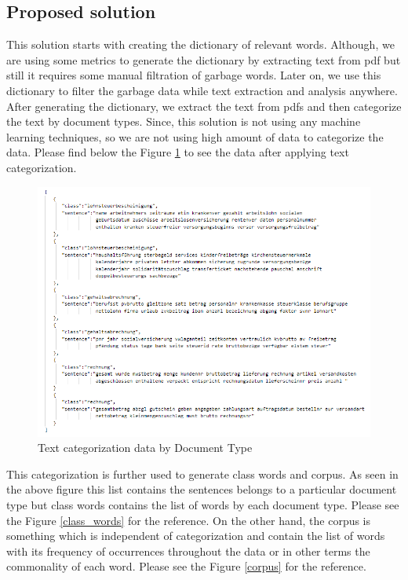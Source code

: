 \subsection{Proposed solution}
This solution starts with creating the dictionary of relevant words. Although, we are using some metrics to generate the dictionary by extracting text from pdf but still it requires some manual filtration of garbage words. Later on, we use this dictionary to filter the garbage data while text extraction and analysis anywhere. After generating the dictionary, we extract the text from pdfs and then categorize the text by document types. Since, this solution is not using any machine learning techniques, so we are not using high amount of data to categorize the data. Please find below the Figure \ref{text_cat_data} to see the data after applying text categorization. 
\begin{figure}[H]
\centering
\includegraphics[scale=0.9]{images/Chapter5/sol_1/sol1-data.png}
\caption{Text categorization data by Document Type}
\label{text_cat_data}
\end{figure}
\par
This categorization is further used to generate class words and corpus. As seen in the above figure  this list contains the sentences belongs to a particular document type but class words contains the list of words by each document type. Please see the Figure \ref{class_words} for the reference. On the other hand, the corpus is something which is independent of categorization and contain the list of words with its frequency of occurrences throughout the data or in other terms the commonality of each word. Please see the Figure \ref{corpus} for the reference.
